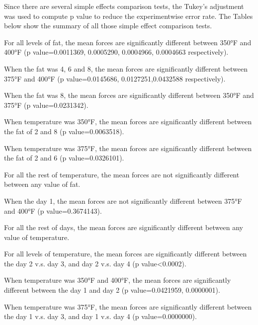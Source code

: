 \documentclass[12pt,]{article}
\begin{document}
Since there are several simple effects comparison tests, the Tukey's
adjustment was used to compute p value to reduce the experimentwise
error rate. The Tables below show the summary of all those simple effect
comparison tests.

For all levels of fat, the mean forces are significantly different
between 350°F and 400°F (p value=0.0011369, 0.0005290, 0.0004966,
0.0004663 respectively).

When the fat was 4, 6 and 8, the mean forces are significantly different
between 375°F and 400°F (p value=0.0145686, 0.0127251,0.0432588
respectively).

When the fat was 8, the mean forces are significantly different between
350°F and 375°F (p value=0.0231342).

When temperature was 350°F, the mean forces are significantly different
between the fat of 2 and 8 (p value=0.0063518).

When temperature was 375°F, the mean forces are significantly different
between the fat of 2 and 6 (p value=0.0326101).

For all the rest of temperature, the mean forces are not significantly
different between any value of fat.

When the day 1, the mean forces are not significantly different between
375°F and 400°F (p value=0.3674143).

For all the rest of days, the mean forces are significantly different
between any value of temperature.

For all levels of temperature, the mean forces are significantly
different between the day 2 v.s. day 3, and day 2 v.s. day 4 (p
value\textless{}0.0002).

When temperature was 350°F and 400°F, the mean forces are significantly
different between the day 1 and day 2 (p value=0.0421959, 0.0000001).

When temperature was 375°F, the mean forces are significantly different
between the day 1 v.s. day 3, and day 1 v.s. day 4 (p value=0.0000000).
\end{document}
